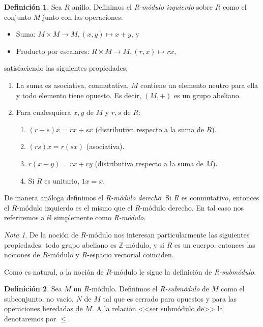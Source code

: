 \documentclass[12pt, a4paper, twoside]{book}
\numberwithin{equation}{section}
\theoremstyle{definition}
\newtheorem{defi}{Definición}
\theoremstyle{remark}
\newtheorem*{remark}{Nota}
\theoremstyle{plain}
\begin{document}
	\begin{defi}
		Sea $R$ anillo. Definimos el \textit{R-módulo izquierdo} sobre
		$R$ como el conjunto $M$ junto con las operaciones:
		\begin{itemize}
			\item Suma: $M \times M \rightarrow M, (x,y) \mapsto 
				x+y$, y
			\item Producto por escalares: $R \times M \rightarrow 
				M, (r,x) \mapsto rx$,	
		\end{itemize}
		satisfaciendo las siguientes propiedades:
		\begin{enumerate}
			\item La suma es asociativa, conmutativa, $M$ contiene
			      un elemento neutro para ella y todo elemento 
			      tiene opuesto. Es decir, $(M,+)$ es un grupo 
			      abeliano.
		      \item Para cualesquiera $x,y$ de $M$ y $r,s$ de $R$: 
		      	\begin{enumerate}
			 	\item $(r+s)x=rx+sx$ (distributiva respecto a 
					la suma de $R$).
				\item $(rs)x=r(sx)$ (asociativa).
				\item $r(x+y)=rx+ry$ (distributiva respecto a 
					la suma de $M$).
				\item Si $R$ es unitario, $1x=x$.	
			\end{enumerate}
		\end{enumerate}
		De manera análoga definimos el \textit{R-módulo derecho}. Si 
		$R$ es conmutativo, entonces el $R$-módulo izquierdo es el 
		mismo que el $R$-módulo derecho. En tal caso nos referiremos a
		él simplemente como \textit{R-módulo}.
	\end{defi}

	\begin{remark}
	De la noción de $R$-módulo nos interesan particularmente las 
	siguientes propiedades: todo grupo abeliano es $\mathbb{Z}$-módulo, y
	si $R$ es un cuerpo, entonces las nociones de $R$-módulo y $R$-espacio
	vectorial coinciden.
	\end{remark}

	Como es natural, a la noción de $R$-módulo le sigue la definición de
	\emph{R-submódulo}.

	\begin{defi}
	Sea $M$ un $R$-módulo. Definimos el \textit{R-submódulo} de $M$ como 
	el subconjunto, no vacío, $N$ de $M$ tal que es cerrado para opuestos 
	y para las operaciones heredadas de $M$. A la relación <<ser submódulo 
	de>> la denotaremos por $\leq$.
	\end{defi}
\end{document}
